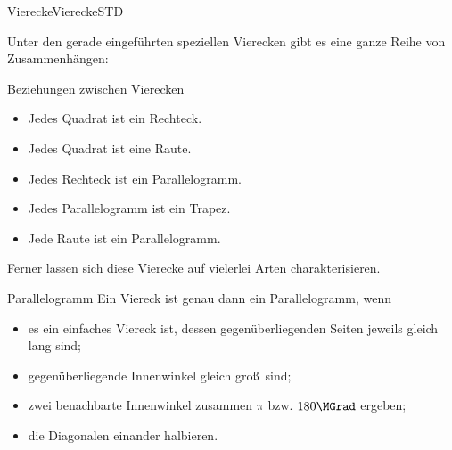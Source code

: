\begin{MXContent}{Vierecke}{Vierecke}{STD}
\begin{center}
\end{center}


Unter den gerade eingef\"uhrten speziellen Vierecken gibt es eine ganze Reihe von Zusammenh\"angen:

\begin{MXInfo}{Beziehungen zwischen Vierecken}%
\begin{itemize}
 \item Jedes Quadrat ist ein Rechteck.
\item Jedes Quadrat ist eine Raute.
\item Jedes Rechteck ist ein Parallelogramm.
\item Jedes Parallelogramm ist ein Trapez.
\item Jede Raute ist ein Parallelogramm.
\end{itemize}
\end{MXInfo}

Ferner lassen sich diese Vierecke auf vielerlei Arten charakterisieren.

\begin{MXInfo}{Parallelogramm}%
Ein Viereck ist genau dann ein Parallelogramm, wenn
\begin{itemize}
 \item es ein einfaches Viereck ist, dessen gegen\"uberliegenden Seiten jeweils gleich lang sind;
\item gegen\"uberliegende Innenwinkel gleich gro\ss\ sind;
\item zwei benachbarte Innenwinkel zusammen $\pi$ bzw. $180\MGrad$ ergeben; 
\item die Diagonalen einander halbieren.
\end{itemize}
\end{MXInfo}



\end{MXContent}
